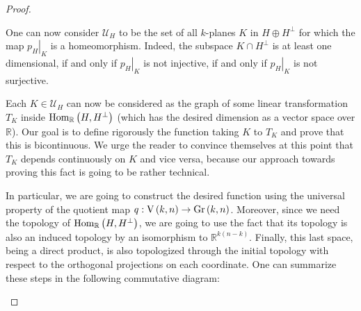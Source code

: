 \begin{proof}
\begin{b_item}
One can now consider $\mathcal{U}_H$ to be the set of all $k$-planes $K$ in $H\oplus H^{\perp}$ for which the map $\left.p_H\right|_{K}$ is a homeomorphism. Indeed, the subspace $K\cap H^{\perp}$ is at least one dimensional, if and only if $\left.p_H\right|_K$ is not injective, if and only if $\left.p_H\right|_K$ is not surjective.

Each $K\in\mathcal{U}_H$ can now be considered as the graph of some linear transformation $T_K$ inside $\mathrm{Hom}_{\mathbb{R}}\left(H,H^{\perp}\right)$ (which has the desired dimension as a vector space over $\mathbb{R}$). Our goal is to define rigorously the function taking $K$ to $T_K$ and prove that this is bicontinuous. We urge the reader to convince themselves at this point that $T_K$ depends continuously on $K$ and vice versa, because our approach towards proving this fact is going to be rather technical.

In particular, we are going to construct the desired function using the universal property of the quotient map $q:\St{k}{n}\to\Gr{k}{n}$. Moreover, since we need the topology of $\mathrm{Hom}_{\mathbb{R}}\left(H,H^{\perp}\right)$, we are going to use the fact that its topology is also an induced topology by an isomorphism to $\mathbb{R}^{k(n-k)}$. Finally, this last space, being a direct product, is also topologized through the initial topology with respect to the orthogonal projections on each coordinate. One can summarize these steps in the following commutative diagram:

\begin{center}
\end{center}


\end{b_item}
\end{proof}
